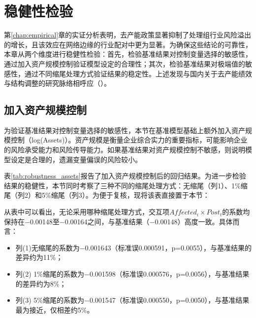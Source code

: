 \chapter{稳健性检验}
\label{chap:robustness}

第\ref{chap:empirical}章的实证分析表明，去产能政策显著抑制了处理组行业风险溢出的增长，且该效应在网络边缘的行业配对中更为显著。为确保这些结论的可靠性，本章从两个维度进行稳健性检验：首先，检验基准结果对控制变量选择的敏感性，通过加入资产规模控制验证模型设定的合理性；其次，检验基准结果对极端值的敏感性，通过不同缩尾处理方式验证结果的稳定性。上述发现与国内关于去产能绩效与结构调整的研究脉络相呼应（\citep{Wang2022DecapacityTFP,Sun2018InnovationConsumption}）。


\section{加入资产规模控制}
为验证基准结果对控制变量选择的敏感性，本节在基准模型基础上额外加入资产规模控制（log(Assets)）。资产规模是衡量企业综合实力的重要指标，可能影响企业的风险承受能力和风险传导能力。如果基准结果对资产规模控制不敏感，则说明模型设定是合理的，遗漏变量偏误的风险较小。

表\ref{tab:robustness_assets}报告了加入资产规模控制后的回归结果。为进一步检验结果的稳健性，本节同时考察了三种不同的缩尾处理方式：无缩尾（列1）、1\%缩尾（列2）和5\%缩尾（列3）。为便于复核，现将该表直接置于本节：

从表中可以看出，无论采用哪种缩尾处理方式，交互项$Affected_i \times Post_t$的系数均保持在$-$0.00148至$-$0.00164之间，与基准结果（$-$0.00148）高度一致。具体而言：

\begin{itemize}
\item 列(1)无缩尾的系数为$-$0.001643（标准误0.000591，p=0.0055），与基准结果的差异约为11\%；
\item 列(2) 1\%缩尾的系数为$-$0.001598（标准误0.000576，p=0.0056），与基准结果的差异约为8\%；
\item 列(3) 5\%缩尾的系数为$-$0.001547（标准误0.000550，p=0.0050），与基准结果最为接近，仅相差约5\%。
\end{itemize}

